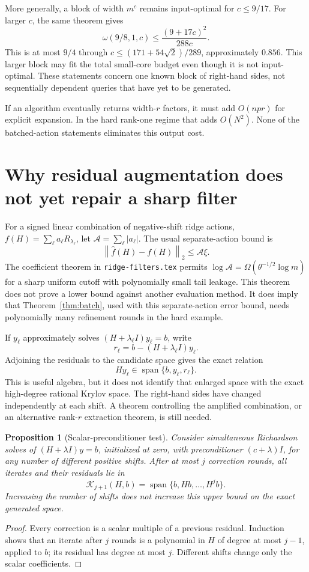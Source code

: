 \documentclass[11pt]{article}
\newtheorem{proposition}[theorem]{Proposition}
\newcommand{\norm}[1]{\left\lVert#1\right\rVert}
\begin{document}
More generally, a block of width \(m^c\) remains input-optimal for
\(c\le9/17\). For larger \(c\), the same theorem gives
\[
 \omega(9/8,1,c)\le\frac{(9+17c)^2}{288c}.
\]
This is at most \(9/4\) through
\(c\le(171+54\sqrt2)/289\), approximately \(0.856\).
This larger block may fit the total small-core budget even though it is
not input-optimal. These statements concern one known block of right-hand
sides, not sequentially dependent queries that have yet to be generated.

If an algorithm eventually returns width-\(r\) factors, it must add
\(O(npr)\) for explicit expansion. In the hard rank-one regime that
adds \(O(N^2)\). None of the batched-action statements eliminates this
output cost.

\section{Why residual augmentation does not yet repair a sharp filter}
For a signed linear combination of negative-shift ridge actions,
\(f(H)=\sum_\ell a_\ell R_{\lambda_\ell}\), let
\(\mathcal A=\sum_\ell|a_\ell|\). The usual separate-action bound
is
\[
 \norm{\widehat f(H)-f(H)}_2\le\mathcal A\xi.
\]
The coefficient theorem in \texttt{ridge-filters.tex} permits
\(\log\mathcal A=\Omega(\theta^{-1/2}\log m)\) for a sharp
uniform cutoff with polynomially small tail leakage. This theorem does
not prove a lower bound against another evaluation method. It does imply
that Theorem~\ref{thm:batch}, used with this separate-action error bound,
needs polynomially many refinement rounds in the hard example.

If \(y_\ell\) approximately solves
\((H+\lambda_\ell I)y_\ell=b\), write
\[
 r_\ell=b-(H+\lambda_\ell I)y_\ell.
\]
Adjoining the residuals to the candidate space gives the exact relation
\[
 H y_\ell\in\operatorname{span}\{b,y_\ell,r_\ell\}.
\]
This is useful algebra, but it does not identify that enlarged space with
the exact high-degree rational Krylov space. The right-hand sides have
changed independently at each shift. A theorem controlling the amplified
combination, or an alternative rank-\(r\) extraction theorem, is still
needed.

\begin{proposition}[Scalar-preconditioner test]\label{prop:scalar}
Consider simultaneous Richardson solves of
\((H+\lambda I)y=b\), initialized at zero, with preconditioner
\((c+\lambda)I\), for any number of different positive shifts.
After at most \(j\) correction rounds, all iterates and their
residuals lie in
\[
 \mathcal K_{j+1}(H,b)
 =\operatorname{span}\{b,Hb,\ldots,H^j b\}.
\]
Increasing the number of shifts does not increase this upper bound on
the exact generated space.
\end{proposition}
\begin{proof}
Every correction is a scalar multiple of a previous residual. Induction
shows that an iterate after \(j\) rounds is a polynomial in \(H\)
of degree at most \(j-1\), applied to \(b\); its residual has degree
at most \(j\). Different shifts change only the scalar coefficients.
\end{proof}
\end{document}
